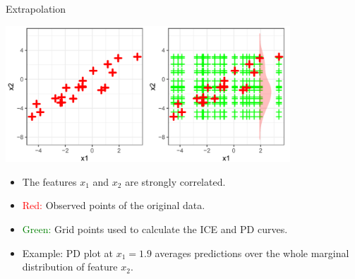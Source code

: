 \begin{vbframe}{Extrapolation}
\framebreak


\begin{center}
\includegraphics[width=0.8\textwidth]{figure_man/extrapolation02.png}
\end{center}

\begin{itemize}
\item The features $x_1$ and $x_2$ are strongly correlated.
\item \textcolor{red}{Red:} Observed points of the original data.
\item \textcolor{green}{Green:} Grid points used to calculate the ICE and PD curves.
\item Example: PD plot at $x_1=1.9$ averages predictions over the whole marginal distribution of feature $x_2$.
\end{itemize}
\end{vbframe}

